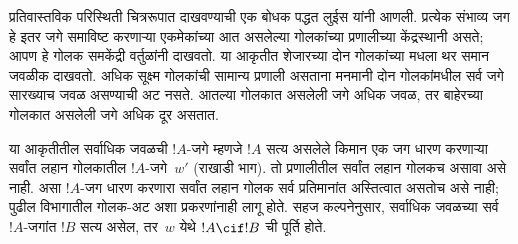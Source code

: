 \documentclass[../../../include/open-logic-section]{subfiles}
\begin{document}
प्रतिवास्तविक परिस्थिती चित्ररूपात
दाखवण्याची एक बोधक पद्धत लुईस
यांनी आणली. प्रत्येक संभाव्य जग
हे इतर जगे समाविष्ट करणाऱ्या
एकमेकांच्या आत असलेल्या गोलकांच्या
प्रणालीच्या केंद्रस्थानी असते;
आपण हे गोलक समकेंद्री
वर्तुळांनी दाखवतो. या आकृतीत शेजारच्या दोन गोलकांच्या मधला थर
समान जवळीक दाखवतो. अधिक सूक्ष्म गोलकांची सामान्य
प्रणाली असताना मनमानी दोन गोलकांमधील सर्व जगे
सारख्याच जवळ असण्याची अट नसते.
आतल्या गोलकात असलेली जगे
अधिक जवळ, तर बाहेरच्या
गोलकात असलेली जगे अधिक
दूर असतात.
\begin{center}
\end{center}
या आकृतीतील सर्वाधिक जवळची $!A$-जगे म्हणजे
$!A$ सत्य असलेले किमान एक जग धारण करणाऱ्या
सर्वांत लहान गोलकातील $!A$-जगे~$w'$ (राखाडी भाग).
तो प्रणालीतील सर्वांत लहान गोलकच असावा असे नाही.
असा $!A$-जग धारण करणारा सर्वांत लहान गोलक
सर्व प्रतिमानांत अस्तित्वात असतोच असे नाही;
पुढील विभागातील गोलक-अट अशा प्रकरणांनाही लागू होते.
सहज कल्पनेनुसार,
सर्वाधिक जवळच्या सर्व
$!A$-जगांत $!B$ सत्य
असेल, तर~$w$ येथे
$!A \cif !B$ ची
पूर्ति होते.
\end{document}
